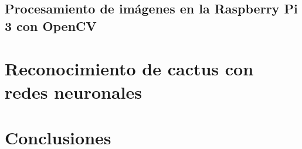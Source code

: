 \documentclass[]{report}
\begin{document}
\section{Procesamiento de imágenes en la Raspberry Pi 3 con OpenCV}

\chapter{Reconocimiento de cactus con redes neuronales}


\chapter{Conclusiones}
 



\end{document}
